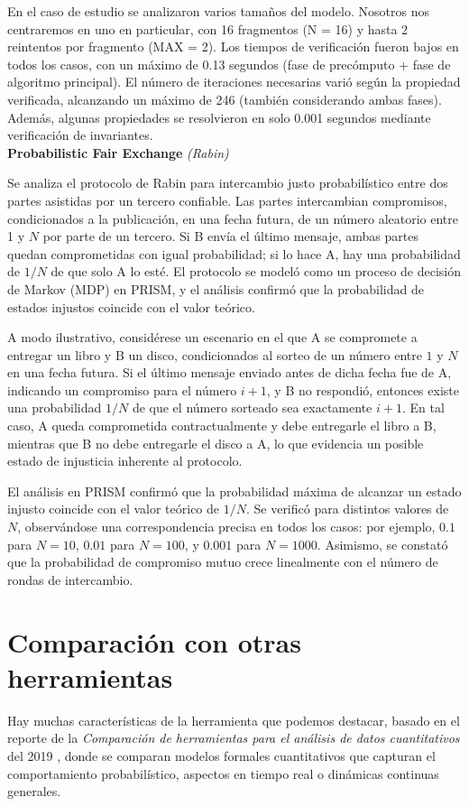 \documentclass[runningheads]{llncs}
\begin{document}
En el caso de estudio se analizaron varios tamaños del modelo. Nosotros nos centraremos en uno en particular, con 16 fragmentos (N = 16) y hasta 2 reintentos por fragmento (MAX = 2). Los tiempos de verificación fueron bajos en todos los casos, con un máximo de 0.13 segundos (fase de precómputo + fase de algoritmo principal). El número de iteraciones necesarias varió según la propiedad verificada, alcanzando un máximo de 246 (también considerando ambas fases). Además, algunas propiedades se resolvieron en solo 0.001 segundos mediante verificación de invariantes.\\

\textbf{Probabilistic Fair Exchange}
\textit{(Rabin)}

Se analiza el protocolo de Rabin para intercambio justo probabilístico entre dos partes asistidas por un tercero confiable. Las partes intercambian compromisos, condicionados a la publicación, en una fecha futura, de un número aleatorio entre 1 y $N$ por parte de un tercero. Si B envía el último mensaje, ambas partes quedan comprometidas con igual probabilidad; si lo hace A, hay una probabilidad de $1/N$ de que solo A lo esté. El protocolo se modeló como un proceso de decisión de Markov (MDP) en PRISM, y el análisis confirmó que la probabilidad de estados injustos coincide con el valor teórico.

A modo ilustrativo, considérese un escenario en el que A se compromete a entregar un libro y B un disco, condicionados al sorteo de un número entre $1$ y $N$ en una fecha futura. Si el último mensaje enviado antes de dicha fecha fue de A, indicando un compromiso para el número $i+1$, y B no respondió, entonces existe una probabilidad $1/N$ de que el número sorteado sea exactamente $i+1$. En tal caso, A queda comprometida contractualmente y debe entregarle el libro a B, mientras que B no debe entregarle el disco a A, lo que evidencia un posible estado de injusticia inherente al protocolo.

El análisis en PRISM confirmó que la probabilidad máxima de alcanzar un estado injusto coincide con el valor teórico de $1/N$. Se verificó para distintos valores de $N$, observándose una correspondencia precisa en todos los casos: por ejemplo, $0.1$ para $N = 10$, $0.01$ para $N = 100$, y $0.001$ para $N = 1000$. Asimismo, se constató que la probabilidad de compromiso mutuo crece linealmente con el número de rondas de intercambio.

\section{Comparación con otras herramientas}
Hay muchas características de la herramienta que podemos destacar, basado en el reporte de la \textit{Comparación de herramientas para el análisis de datos cuantitativos} del 2019 \cite{Hahn2019}, donde se comparan modelos formales cuantitativos que capturan el comportamiento probabilístico, aspectos en tiempo real o dinámicas continuas generales.
\end{document}
